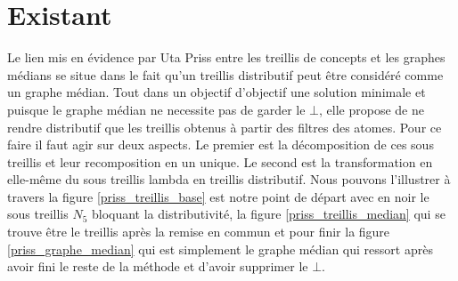 \chapter{Existant}

Le lien mis en évidence par Uta Priss entre les treillis de concepts et les graphes médians se situe dans le fait qu'un treillis distributif peut être considéré comme un graphe médian. Tout dans un objectif d'objectif une solution minimale  et puisque le graphe médian ne necessite pas de garder le $\bot$, elle propose de ne rendre distributif que les treillis obtenus à partir des filtres des atomes. Pour ce faire il faut agir sur deux aspects. Le premier est la décomposition de ces sous treillis et leur recomposition en un unique. Le second est la transformation en elle-même du sous treillis lambda en treillis distributif. Nous pouvons l'illustrer à travers la figure \ref{priss_treillis_base} est notre point de départ avec en noir le sous treillis $N_5$ bloquant la distributivité, la figure \ref{priss_treillis_median} qui se trouve être le treillis après la remise en commun et pour finir la figure \ref{priss_graphe_median} qui est simplement le graphe médian qui ressort après avoir fini le reste de la méthode et d'avoir supprimer le $\bot$.

